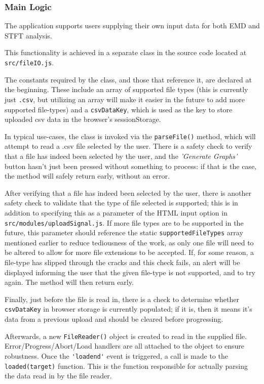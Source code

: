 \subsubsection{Main Logic}
The application supports users supplying their own input data for both EMD and STFT analysis. 

This functionality is achieved in a separate class in the source code located at \verb|src/fileIO.js|. 

The constants required by the class, and those that reference it, are declared at the beginning. These include an array of supported file types (this is currently just \verb|.csv|, but utilizing an array will make it easier in the future to add more supported file-types) and a \verb|csvDataKey|, which is used as the key to store uploaded csv data in the browser's sessionStorage.

In typical use-cases, the class is invoked via the \verb|parseFile()| method, which will attempt to read a .csv file selected by the user. There is a safety check to verify that a file has indeed been selected by the user, and the {\it 'Generate Graphs'} button hasn't just been pressed without something to process: if that is the case, the method will safely return early, without an error.

After verifying that a file has indeed been selected by the user, there is another safety check to validate that the type of file selected is supported; this is in addition to specifying this as a parameter of the HTML input option in \verb|src/modules/uploadSignal.js|. If more file types are to be supported in the future, this parameter should reference the static \verb|supportedFileTypes| array mentioned earlier to reduce tediousness of the work, as only one file will need to be altered to allow for more file extensions to be accepted.
If, for some reason, a file-type has slipped through the cracks and this check fails, an alert will be displayed informing the user that the given file-type is not supported, and to try again. The method will then return early.

Finally, just before the file is read in, there is a check to determine whether \verb|csvDataKey| in browser storage is currently populated; if it is, then it means it's data from a previous upload and should be cleared before progressing. 

Afterwards, a new \verb|FileReader()| object is created to read in the supplied file. Error/Progress/Abort/Load handlers are all attached to the object to ensure robustness. Once the \verb|'loadend'| event is triggered, a call is made to the \verb|loaded(target)| function. This is the function responsible for actually parsing the data read in by the file reader.

